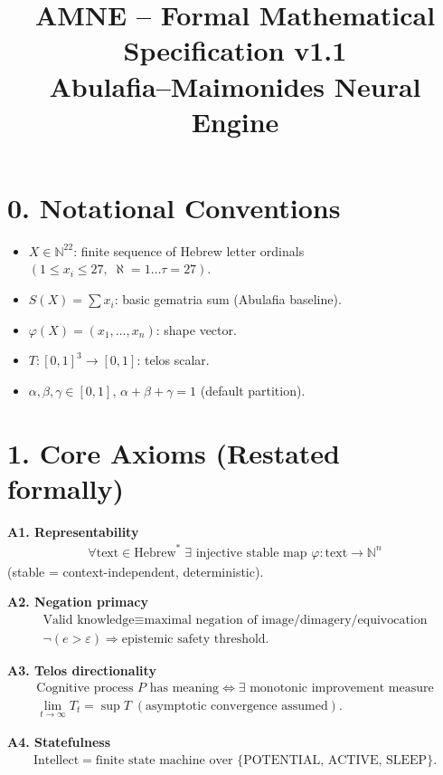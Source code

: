 \documentclass[11pt]{article}
\title{AMNE -- Formal Mathematical Specification v1.1\\Abulafia--Maimonides Neural Engine}
\author{}
\date{}
\begin{document}
\maketitle

\section*{0. Notational Conventions}
\begin{itemize}
    \item $X \in \mathbb{N}^{22}$: finite sequence of Hebrew letter ordinals $(1 \leq x_i \leq 27, \; \aleph=1 \ldots \tau=27)$.
    \item $S(X) = \sum x_i$: basic gematria sum (Abulafia baseline).
    \item $\varphi(X) = (x_1, \ldots, x_n)$: shape vector.
    \item $T: [0,1]^3 \to [0,1]$: telos scalar.
    \item $\alpha, \beta, \gamma \in [0,1]$, $\alpha + \beta + \gamma = 1$ (default partition).
\end{itemize}

\section*{1. Core Axioms (Restated formally)}
\textbf{A1. Representability}
\begin{align*}
    \forall \text{text} \in \text{Hebrew}^* \; \exists \text{ injective stable map } \varphi : \text{text} \to \mathbb{N}^n
\end{align*}
\noindent (stable = context-independent, deterministic).

\textbf{A2. Negation primacy}
\begin{align*}
    \text{Valid knowledge} \equiv \text{maximal negation of image/dimagery/equivocation}\\
    \neg(e > \varepsilon) \Rightarrow \text{epistemic safety threshold.}
\end{align*}

\textbf{A3. Telos directionality}
\begin{align*}
    \text{Cognitive process } P \text{ has meaning} \Leftrightarrow \exists \text{ monotonic improvement measure}\\
    \lim_{t \to \infty} T_t = \sup T \; (\text{asymptotic convergence assumed}).
\end{align*}

\textbf{A4. Statefulness}
\begin{align*}
    \text{Intellect} = \text{finite state machine over } \{\text{POTENTIAL, ACTIVE, SLEEP}\}.
\end{align*}
\end{document}
